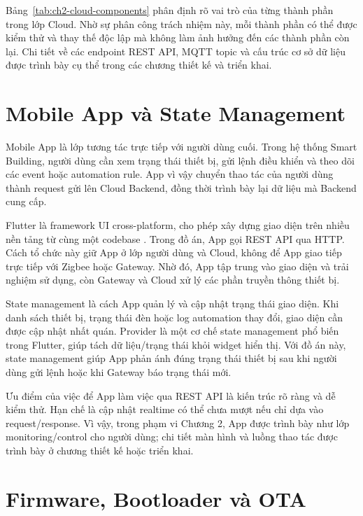 Bảng~\ref{tab:ch2-cloud-components} phân định rõ vai trò của từng thành phần trong lớp Cloud. Nhờ sự phân công trách nhiệm này, mỗi thành phần có thể được kiểm thử và thay thế độc lập mà không làm ảnh hưởng đến các thành phần còn lại. Chi tiết về các endpoint REST API, MQTT topic và cấu trúc cơ sở dữ liệu được trình bày cụ thể trong các chương thiết kế và triển khai.

\section{Mobile App và State Management}
\label{sec:ch2-mobile-state}

Mobile App là lớp tương tác trực tiếp với người dùng cuối. Trong hệ thống Smart Building, người dùng cần xem trạng thái thiết bị, gửi lệnh điều khiển và theo dõi các event hoặc automation rule. App vì vậy chuyển thao tác của người dùng thành request gửi lên Cloud Backend, đồng thời trình bày lại dữ liệu mà Backend cung cấp.

Flutter là framework UI cross-platform, cho phép xây dựng giao diện trên nhiều nền tảng từ cùng một codebase \cite{flutter-docs}. Trong đồ án, App gọi REST API qua HTTP. Cách tổ chức này giữ App ở lớp người dùng và Cloud, không để App giao tiếp trực tiếp với Zigbee hoặc Gateway. Nhờ đó, App tập trung vào giao diện và trải nghiệm sử dụng, còn Gateway và Cloud xử lý các phần truyền thông thiết bị.

State management là cách App quản lý và cập nhật trạng thái giao diện. Khi danh sách thiết bị, trạng thái đèn hoặc log automation thay đổi, giao diện cần được cập nhật nhất quán. Provider là một cơ chế state management phổ biến trong Flutter, giúp tách dữ liệu/trạng thái khỏi widget hiển thị. Với đồ án này, state management giúp App phản ánh đúng trạng thái thiết bị sau khi người dùng gửi lệnh hoặc khi Gateway báo trạng thái mới.

Ưu điểm của việc để App làm việc qua REST API là kiến trúc rõ ràng và dễ kiểm thử. Hạn chế là cập nhật realtime có thể chưa mượt nếu chỉ dựa vào request/response. Vì vậy, trong phạm vi Chương 2, App được trình bày như lớp monitoring/control cho người dùng; chi tiết màn hình và luồng thao tác được trình bày ở chương thiết kế hoặc triển khai.

\section{Firmware, Bootloader và OTA}
\label{sec:ch2-firmware-ota}


